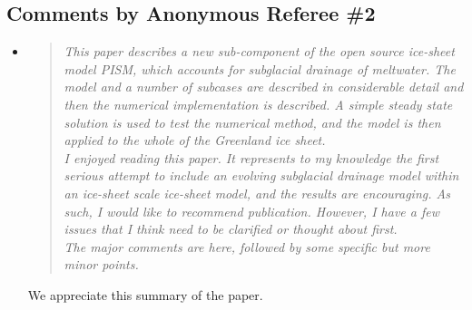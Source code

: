\documentclass[11pt,reqno]{amsart}
\newcommand{\reply}[2]{
\medskip\medskip
\item  \begin{quote}
\emph{#1}
\end{quote}

\medskip
\noindent #2}
\begin{document}
\subsection*{Comments by Anonymous Referee \#2}\begin{itemize}
\reply{This paper describes a new sub-component of the open source ice-sheet model PISM,
which accounts for subglacial drainage of meltwater.  The model and a number of
subcases are described in considerable detail and then the numerical implementation
is described.  A simple steady state solution is used to test the numerical method, and
the model is then applied to the whole of the Greenland ice sheet.\\
\indent I enjoyed reading this paper.  It represents to my knowledge the first serious attempt
to include an evolving subglacial drainage model within an ice-sheet scale ice-sheet
model, and the results are encouraging.  As such, I would like to recommend publication.  However, I have a few issues that I think need to be clarified or thought about first.\\
\indent The major comments are here, followed by some specific but more minor points.}
{We appreciate this summary of the paper.}


\end{itemize}
\end{document}
